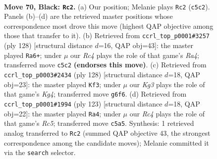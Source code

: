 \documentclass[11pt]{article}
\begin{document}
\clearpage

\begin{figure}[p]\centering
\begin{subfigure}{0.46\textwidth}\centering
\resizebox{\linewidth}{!}{%
\newchessgame
\chessboard[
  setfen={1R6/5p2/3Rp1k1/2r5/P3P3/5PK1/8/8 b - - 32 70},
  showmover=false,
  pgfstyle=straightmove, color=movearrow, markmove={c5-c2}
]}
\caption{}
\end{subfigure}\hfill
\begin{subfigure}{0.46\textwidth}\centering
\resizebox{\linewidth}{!}{%
\newchessgame
\chessboard[
  setfen={8/8/5kp1/5p2/R7/3rPK2/6P1/8 w - - 18 65},
  showmover=false,
  pgfstyle=straightmove, color=movearrow, markmove={a4-a6}
]}
\caption{}
\end{subfigure}
\\[4pt]
\begin{subfigure}{0.46\textwidth}\centering
\resizebox{\linewidth}{!}{%
\newchessgame
\chessboard[
  setfen={8/5pk1/1R4p1/8/3r1PK1/7P/8/8 w - - 11 65},
  showmover=false,
  pgfstyle=straightmove, color=movearrow, markmove={g4-f3}
]}
\caption{}
\end{subfigure}\hfill
\begin{subfigure}{0.46\textwidth}\centering
\resizebox{\linewidth}{!}{%
\newchessgame
\chessboard[
  setfen={8/8/3R1pk1/4p3/2r3P1/4PK2/8/8 b - - 2 62},
  showmover=false,
  pgfstyle=straightmove, color=movearrow, markmove={c4-a4}
]}
\caption{}
\end{subfigure}
\caption{\textbf{Move 70, Black: \texttt{Rc2}.} (a) Our position; Melanie plays \texttt{Rc2} (\texttt{c5c2}). Panels (b)--(d) are the retrieved master positions whose correspondence most drove this move (highest QAP objective among those that transfer to it). (b) Retrieved from \texttt{ccrl\_top\_p0001\#3257} (ply 128) [structural distance $d$=16, QAP obj=43]: the master played \texttt{Ra6+}; under $\mu$ our \emph{Rc4} plays the role of that game's \emph{Ra4}; transferred move \texttt{c5c2} \textbf{(endorses this move)}. (c) Retrieved from \texttt{ccrl\_top\_p0003\#2434} (ply 128) [structural distance $d$=18, QAP obj=23]: the master played \texttt{Kf3}; under $\mu$ our \emph{Kg3} plays the role of that game's \emph{Kg4}; transferred move \texttt{g6f6}. (d) Retrieved from \texttt{ccrl\_top\_p0001\#1994} (ply 123) [structural distance $d$=18, QAP obj=22]: the master played \texttt{Ra4}; under $\mu$ our \emph{Rc4} plays the role of that game's \emph{Rc5}; transferred move \texttt{c5a5}. Synthesis: 1 retrieved analog transferred to \texttt{Rc2} (summed QAP objective 43, the strongest correspondence among the candidate moves); Melanie committed it via the \texttt{search} selector.}
\label{fig:thought-m139}
\end{figure}
\end{document}
